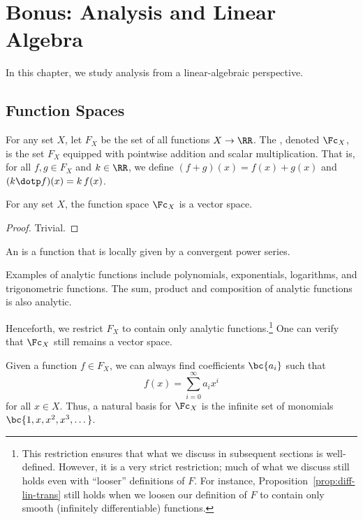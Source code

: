 \chapter{Bonus: Analysis and Linear Algebra}

In this chapter, we study analysis from a linear-algebraic perspective.

\section{Function Spaces}

\begin{definition}
    For any set $X$, let $F_X$ be the set of all functions $X \to \RR$. The , denoted $\Fc_X$, is the set $F_X$ equipped with pointwise addition and scalar multiplication. That is, for all $f, g \in F_X$ and $k \in \RR$, we define $(f+g)(x) = f(x) + g(x)$ and $(k \dotp f)(x) = k \, f(x)$.
\end{definition}

\begin{proposition}
    For any set $X$, the function space $\Fc_X$ is a vector space.
\end{proposition}
\begin{proof}
    Trivial.
\end{proof}

\begin{definition}
    An  is a function that is locally given by a convergent power series.
\end{definition}

Examples of analytic functions include polynomials, exponentials, logarithms, and trigonometric functions. The sum, product and composition of analytic functions is also analytic.

Henceforth, we restrict $F_X$ to contain only analytic functions.\footnote{This restriction ensures that what we discuss in subsequent sections is well-defined. However, it is a very strict restriction; much of what we discuss still holds even with ``looser'' definitions of $F$. For instance, Proposition~\ref{prop:diff-lin-trans} still holds when we loosen our definition of $F$ to contain only smooth (infinitely differentiable) functions.} One can verify that $\Fc_X$ still remains a vector space.

Given a function $f \in F_X$, we can always find coefficients $\bc{a_i}$ such that \[f(x) = \sum_{i = 0}^\infty a_i x^i\] for all $x \in X$. Thus, a natural basis for $\Fc_X$ is the infinite set of monomials $\bc{1, x, x^2, x^3, \dots}$.

